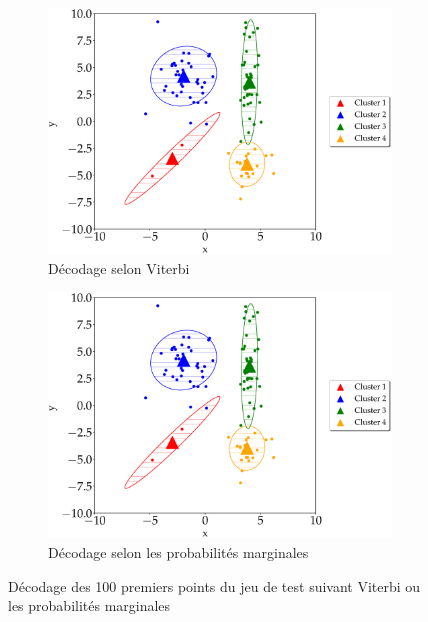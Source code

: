 \documentclass[12pt,a4paper,onecolumn]{article}
\begin{document}
\subsection{}

\begin{figure}[H]
	\centering
	\begin{subfigure}[b]{0.85\textwidth}
		\centering
		\includegraphics[width = 1.0\textwidth]{11_viterbi_decoding_test}
		\caption{Décodage selon Viterbi}
	\end{subfigure}
	\hfill
	\begin{subfigure}[b]{0.85\textwidth}
		\centering
		\includegraphics[width = 1.0\textwidth]{10_marginals}
		\caption{Décodage selon les probabilités marginales}
	\end{subfigure}
	\caption{Décodage des 100 premiers points du jeu de test suivant Viterbi ou les probabilités marginales}
	\label{fig_11_decodage_test}
\end{figure}
\end{document}
